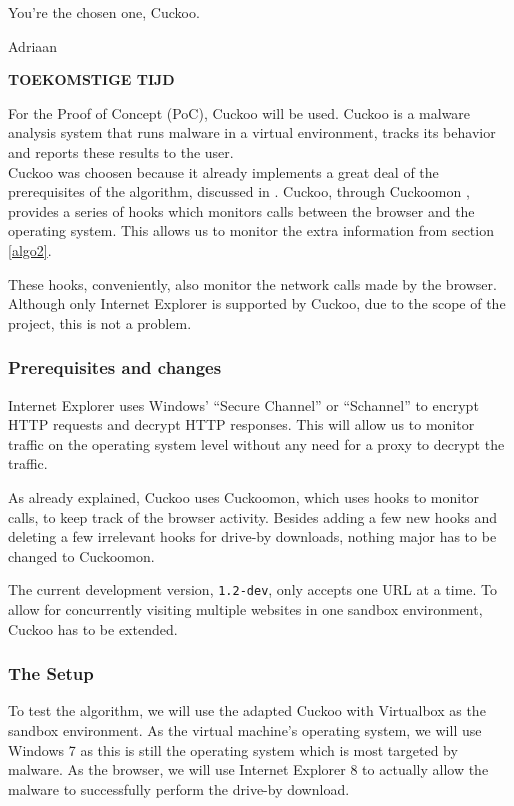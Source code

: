 \epigraph{You're the chosen one, Cuckoo.}{Adriaan}

\textbf{TOEKOMSTIGE TIJD}

For the Proof of Concept (PoC), Cuckoo \cite{cuckoo} will be used. Cuckoo is a malware analysis system that runs malware in a virtual environment, tracks its behavior and reports these results to the user.\\

Cuckoo was choosen because it already implements a great deal of the prerequisites of the algorithm, discussed in . Cuckoo, through Cuckoomon \cite{cuckoomon}, provides a series of hooks which monitors calls between the browser and the operating system. This allows us to monitor the extra information from section \ref{algo2}. 

These hooks, conveniently, also monitor the network calls made by the browser. Although only Internet Explorer is supported by Cuckoo, due to the scope of the project, this is not a problem.

\subsubsection{Prerequisites and changes}

Internet Explorer uses Windows' ``Secure Channel'' or ``Schannel'' \cite{schannel} to encrypt HTTP requests and decrypt HTTP responses. This will allow us to monitor traffic on the operating system level without any need for a proxy to decrypt the traffic.

As already explained, Cuckoo uses Cuckoomon, which uses hooks to monitor calls, to keep track of the browser activity. Besides adding a few new hooks and deleting a few irrelevant hooks for drive-by downloads, nothing major has to be changed to Cuckoomon.

The current development version, \texttt{1.2-dev},  only accepts one URL at a time. To allow for concurrently visiting multiple websites in one sandbox environment, Cuckoo has to be extended.

\subsubsection{The Setup}

To test the algorithm, we will use the adapted Cuckoo with Virtualbox as the sandbox environment. As the virtual machine's operating system, we will use Windows 7 as this is still the operating system which is most targeted by malware. As the browser, we will use Internet Explorer 8 to actually allow the malware to successfully perform the drive-by download.

